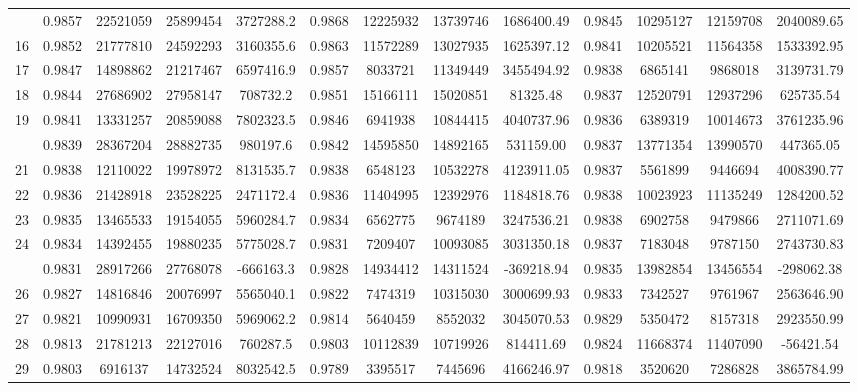 \documentclass[
  12pt,
]{article}
\begin{document}
\begin{longtable}[t]{lcccccccccccc}
\addlinespace
15 & 0.9857 & 22521059 & 25899454 & 3727288.2 & 0.9868 & 12225932 & 13739746 & 1686400.49 & 0.9845 & 10295127 & 12159708 & 2040089.65\\
16 & 0.9852 & 21777810 & 24592293 & 3160355.6 & 0.9863 & 11572289 & 13027935 & 1625397.12 & 0.9841 & 10205521 & 11564358 & 1533392.95\\
17 & 0.9847 & 14898862 & 21217467 & 6597416.9 & 0.9857 & 8033721 & 11349449 & 3455494.92 & 0.9838 & 6865141 & 9868018 & 3139731.79\\
18 & 0.9844 & 27686902 & 27958147 & 708732.2 & 0.9851 & 15166111 & 15020851 & 81325.48 & 0.9837 & 12520791 & 12937296 & 625735.54\\
19 & 0.9841 & 13331257 & 20859088 & 7802323.5 & 0.9846 & 6941938 & 10844415 & 4040737.96 & 0.9836 & 6389319 & 10014673 & 3761235.96\\
\addlinespace
20 & 0.9839 & 28367204 & 28882735 & 980197.6 & 0.9842 & 14595850 & 14892165 & 531159.00 & 0.9837 & 13771354 & 13990570 & 447365.05\\
21 & 0.9838 & 12110022 & 19978972 & 8131535.7 & 0.9838 & 6548123 & 10532278 & 4123911.05 & 0.9837 & 5561899 & 9446694 & 4008390.77\\
22 & 0.9836 & 21428918 & 23528225 & 2471172.4 & 0.9836 & 11404995 & 12392976 & 1184818.76 & 0.9838 & 10023923 & 11135249 & 1284200.52\\
23 & 0.9835 & 13465533 & 19154055 & 5960284.7 & 0.9834 & 6562775 & 9674189 & 3247536.21 & 0.9838 & 6902758 & 9479866 & 2711071.69\\
24 & 0.9834 & 14392455 & 19880235 & 5775028.7 & 0.9831 & 7209407 & 10093085 & 3031350.18 & 0.9837 & 7183048 & 9787150 & 2743730.83\\
\addlinespace
25 & 0.9831 & 28917266 & 27768078 & -666163.3 & 0.9828 & 14934412 & 14311524 & -369218.94 & 0.9835 & 13982854 & 13456554 & -298062.38\\
26 & 0.9827 & 14816846 & 20076997 & 5565040.1 & 0.9822 & 7474319 & 10315030 & 3000699.93 & 0.9833 & 7342527 & 9761967 & 2563646.90\\
27 & 0.9821 & 10990931 & 16709350 & 5969062.2 & 0.9814 & 5640459 & 8552032 & 3045070.53 & 0.9829 & 5350472 & 8157318 & 2923550.99\\
28 & 0.9813 & 21781213 & 22127016 & 760287.5 & 0.9803 & 10112839 & 10719926 & 814411.69 & 0.9824 & 11668374 & 11407090 & -56421.54\\
29 & 0.9803 & 6916137 & 14732524 & 8032542.5 & 0.9789 & 3395517 & 7445696 & 4166246.97 & 0.9818 & 3520620 & 7286828 & 3865784.99\\

\end{longtable}
\end{document}
